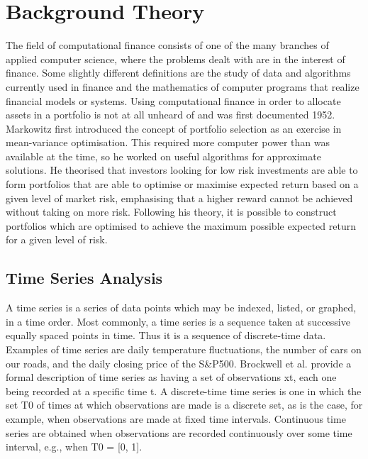 \chapter{Background Theory}

The field of computational finance consists of one of the many branches of applied computer science, where the problems dealt with are in the interest of finance. Some slightly different definitions are the study of data and algorithms currently used in finance and the mathematics of computer programs that realize financial models or systems. Using computational finance in order to allocate assets in a portfolio is not at all unheard of and was first documented  1952.\cite{Markowitz:1952aa} Markowitz first introduced the concept of portfolio selection as an exercise in mean-variance optimisation. This required more computer power than was available at the time, so he worked on useful algorithms for approximate solutions. He theorised that investors looking for low risk investments are able to form portfolios that are able to optimise or maximise expected return based on a given level of market risk, emphasising that a higher reward cannot be achieved without taking on more risk. Following his theory, it is possible to construct portfolios which are optimised to achieve the maximum possible expected return for a given level of risk.

\section{Time Series Analysis}

A time series is a series of data points which may be indexed, listed, or graphed, in a time order. Most commonly, a time series is a sequence taken at successive equally spaced points in time. Thus it is a sequence of discrete-time data. Examples of time series are daily temperature fluctuations, the number of cars on our roads, and the daily closing price of the S\&P500. Brockwell et al. provide a formal description of time series as having a set of observations xt, each one being recorded at a specific time t. A discrete-time time series is one in which the set T0 of times at which observations are made is a discrete set, as is the case, for example, when observations are made at fixed time intervals. Continuous time series are obtained when observations are recorded continuously over some time interval, e.g., when T0 = [0, 1].\cite{Peter-J.-Brockwell:2016aa}

